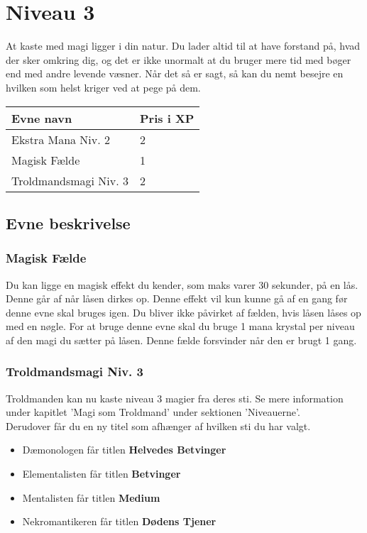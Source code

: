 \chapter{Niveau 3}
At kaste med magi ligger i din natur. Du lader altid til at have forstand på, hvad der sker omkring dig, og det er ikke unormalt at du bruger mere tid med bøger end med andre levende væsner. Når det så er sagt, så kan du nemt besejre en hvilken som helst kriger ved at pege på dem.

\begin{table}[H]
    \centering
    \begin{tabular}{|p{}|p{}|}
    \rowcolor{cerulean!80}\hline
        Evne navn & Pris i XP \\\hline
        Ekstra Mana Niv. 2 & 2\\\hline
        Magisk Fælde & 1\\\hline 
        Troldmandsmagi Niv. 3 & 2\\\hline
    \end{tabular}
\end{table}
\section*{Evne beskrivelse}




\subsection{Magisk Fælde}
Du kan ligge en magisk effekt du kender, som maks varer 30 sekunder, på en lås. Denne går af når låsen dirkes op. Denne effekt vil kun kunne gå af en gang før denne evne skal bruges igen. Du bliver ikke påvirket af fælden, hvis låsen låses op med en nøgle. For at bruge denne evne skal du bruge 1 mana krystal per niveau af den magi du sætter på låsen. Denne fælde forsvinder når den er brugt 1 gang.

\subsection{Troldmandsmagi Niv. 3}
Troldmanden kan nu kaste niveau 3 magier fra deres sti. Se mere information under kapitlet 'Magi som Troldmand' under sektionen 'Niveauerne'. \\
Derudover får du en ny titel som afhænger af hvilken sti du har valgt.\\
\begin{itemize}
    \item Dæmonologen får titlen \textbf{Helvedes Betvinger}
    \item Elementalisten får titlen \textbf{Betvinger}
    \item Mentalisten får titlen \textbf{Medium}
    \item Nekromantikeren får titlen \textbf{Dødens Tjener}
\end{itemize}